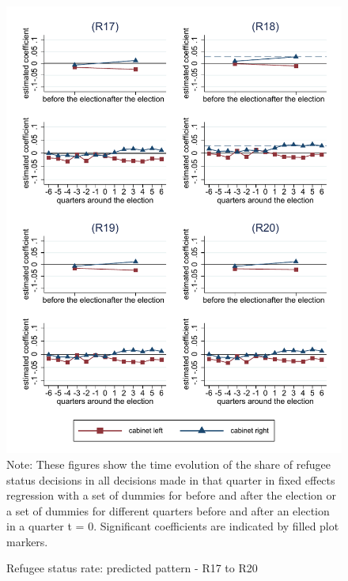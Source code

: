 \documentclass[11pt,a4paper]{scrartcl}
\begin{document}
\clearpage
\FloatBarrier
\begin{figure}[!ht]
	\caption{Refugee status rate: predicted pattern - R17 to R20}
	\includegraphics[width=1\textwidth]{../results/decisions/refugeestatus_rate_graphs_R17-R20.pdf}
	\scriptsize{Note: These figures show the time evolution of the share of refugee status decisions in all decisions made in that quarter in fixed effects regression with a set of dummies for before and after the election or a set of dummies for different quarters before and after an election in a quarter t = 0. Significant coefficients are indicated by filled plot markers.}
\end{figure}





\clearpage
\FloatBarrier
\end{document}
